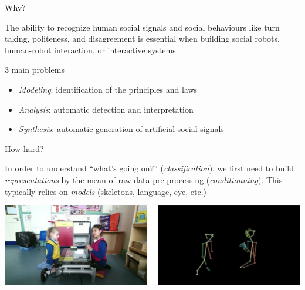 \documentclass[compress]{beamer}
\begin{document}
\begin{frame}{Why?}

    The ability to recognize human social signals and social behaviours like turn
    taking, politeness, and disagreement is essential when building social
    robots, human-robot interaction, or interactive systems

\pause

    \begin{exampleblock}{3 main problems}

    \begin{itemize}
        \item \emph{Modeling}: identification of the principles and laws
        \item \emph{Analysis}: automatic detection and interpretation
        \item \emph{Synthesis}: automatic generation of artificial social
            signals
    \end{itemize}

    \end{exampleblock}
\end{frame}

\begin{frame}{How hard?}

    In order to understand ``what's going on?'' (\emph{classification}), we
    first need to build \emph{representations} by the mean of raw data
    pre-processing (\emph{conditionning}). This typically relies on
    \emph{models} (skeletons, language, eye, etc.)

    \begin{center}
        \includegraphics[width=0.9\linewidth]{pinsoro-kinematics/clips}
    \end{center}

\end{frame}




\end{document}
